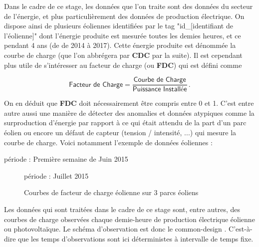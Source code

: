 
Dans le cadre de ce stage, les données que l'on traite sont des données du secteur de l'énergie, et plus particulièrement des données de production électrique. On dispose ainsi de plusieurs éoliennes identifiées par le tag "id\_[identifiant de l'éolienne]" dont l'énergie produite est mesurée toutes les demies heures, et ce pendant 4 ans (de de 2014 à 2017).
Cette énergie produite est dénommée la courbe de charge (que l'on abbrégera par \textbf{CDC} par la suite). Il est cependant plus utile de s'intéresser au facteur de charge (ou \textbf{FDC}) qui est défini comme

\begin{equation*}
\displaystyle\textsf{Facteur de Charge} = \frac{\textsf{Courbe de Charge}}{\textsf{Puissance Installée}} \, .
\end{equation*}

On en déduit que \textbf{FDC} doit nécessairement être compris entre 0 et 1. C'est entre autre aussi une manière de détecter des anomalies et données atypiques comme la surproduction d'énergie par rapport à ce qui était attendu de la part d'un parc éolien ou encore un défaut de capteur (tension / intensité, ...) qui mesure la courbe de charge. Voici notamment l'exemple de données éoliennes :


\begin{center}
	période : Première semaine de Juin 2015
	
\end{center}

\begin{figure}[H]
	\centering

	période : Juillet 2015

	\caption{Courbes de facteur de charge éolienne sur 3 parcs éoliens}
	\label{fig:courbes_de_charge}
\end{figure}

\bigskip

Les données qui sont traitées dans le cadre de ce stage sont, entre autres, des courbes de charge observées chaque demie-heure de production électrique éolienne ou photovoltaïque. Le schéma d’observation est donc le \og common-design \fg. C'est-à-dire que les temps d'observations sont ici déterministes à intervalle de temps fixe.